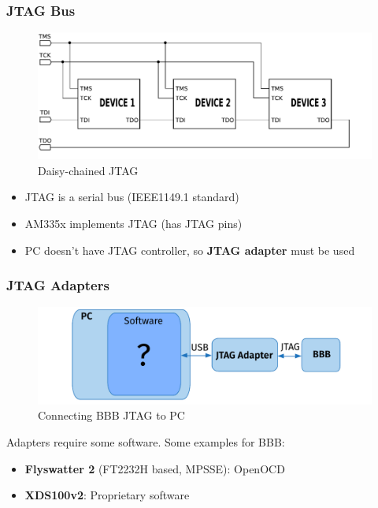 \begin{frame}
  \frametitle{JTAG Bus}
  \begin{figure}
    \centering
    \includegraphics[scale=0.45]{images/jtag_chain.pdf}
    \caption{Daisy-chained JTAG}
  \end{figure}
  \begin{itemize}
    \item JTAG is a serial bus (IEEE1149.1 standard)
    \item AM335x implements JTAG (has JTAG pins)
    \item PC doesn't have JTAG controller, so \textbf{JTAG adapter} must be used
  \end{itemize}
\end{frame}

\begin{frame}
  \frametitle{JTAG Adapters}
  \begin{figure}
    \centering
    \includegraphics[scale=0.6]{images/jtag-sw.pdf}
    \caption{Connecting BBB JTAG to PC}
  \end{figure}
  Adapters require some software. Some examples for BBB:
    \begin{itemize}
      \item \textbf{Flyswatter 2} (FT2232H based, MPSSE): OpenOCD
      \item \textbf{XDS100v2}: Proprietary software
    \end{itemize}
\end{frame}

